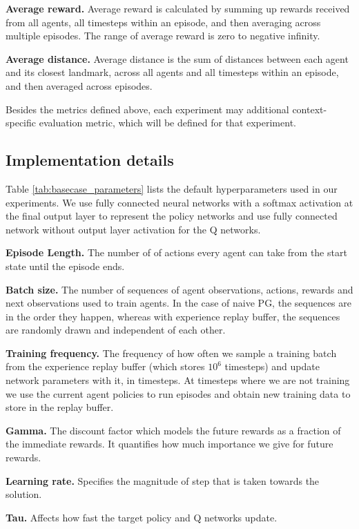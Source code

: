 \documentclass{article}
\begin{document}
\textbf{Average reward.} Average reward is calculated by summing up rewards received from all agents, all timesteps within an episode, and then averaging across multiple episodes. The range of average reward is zero to negative infinity. 

\textbf{Average distance.} Average distance is the sum of distances between each agent and its closest landmark, across all agents and all timesteps within an episode, and then averaged across episodes.

Besides the metrics defined above, each experiment may additional context-specific evaluation metric, which will be defined for that experiment.


\subsection{Implementation details}

Table \ref{tab:basecase_parameters} lists the default hyperparameters used in our experiments. We use fully connected neural networks with a softmax activation at the final output layer to represent the policy networks and use fully connected network without output layer activation for the Q networks.

\textbf{Episode Length.} The number of of actions every agent can take from the start state until the episode ends.

\textbf{Batch size.} The number of sequences of agent observations, actions, rewards and next observations used to train agents. In the case of naive PG, the sequences are in the order they happen, whereas with experience replay buffer, the sequences are randomly drawn and independent of each other. 

\textbf{Training frequency.} The frequency of how often we sample a training batch from the experience replay buffer (which stores $10^6$ timesteps) and update network parameters with it, in timesteps. At timesteps where we are not training we use the current agent policies to run episodes and obtain new training data to store in the replay buffer.

\textbf{Gamma.} The discount factor which models the future rewards as a fraction of the immediate rewards. It quantifies how much importance we give for future rewards.

\textbf{Learning rate.} Specifies the magnitude of step that is taken towards the solution. 

\textbf{Tau.} Affects how fast the target policy and Q networks update. 
\end{document}
